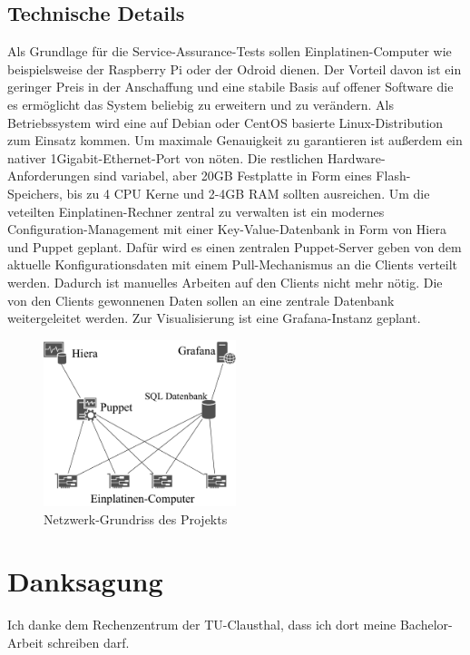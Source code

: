 \documentclass[conference]{IEEEtran}
\begin{document}
\subsection{Technische Details}
Als Grundlage für die Service-Assurance-Tests sollen
Einplatinen-Computer wie beispielsweise der Raspberry Pi oder der Odroid
dienen. Der Vorteil davon ist ein geringer Preis in der Anschaffung und
eine stabile Basis auf offener Software die es ermöglicht das System
beliebig zu erweitern und zu verändern. Als Betriebssystem wird eine auf
Debian oder CentOS basierte Linux-Distribution zum Einsatz kommen. Um
maximale Genauigkeit zu garantieren ist außerdem ein nativer
1Gigabit-Ethernet-Port von nöten. Die restlichen Hardware-Anforderungen
sind variabel, aber 20GB Festplatte in Form eines Flash-Speichers, bis
zu 4 CPU Kerne und 2-4GB RAM sollten ausreichen. Um die veteilten
Einplatinen-Rechner zentral zu verwalten ist ein modernes
Configuration-Management mit einer Key-Value-Datenbank in Form von Hiera
und Puppet geplant. Dafür wird es einen zentralen Puppet-Server geben
von dem aktuelle Konfigurationsdaten mit einem Pull-Mechanismus an die
Clients verteilt werden. Dadurch ist manuelles Arbeiten auf den Clients
nicht mehr nötig. Die von den Clients gewonnenen Daten sollen an eine
zentrale Datenbank weitergeleitet werden. Zur Visualisierung ist eine
Grafana-Instanz geplant.
\begin{figure}[h]
    \centering
    \includegraphics[width=0.5\textwidth]{figures/network.pdf}
    \caption{Netzwerk-Grundriss des Projekts}\label{fig:1}
\end{figure}

\section*{Danksagung}
Ich danke dem Rechenzentrum der TU-Clausthal, dass ich dort meine
Bachelor-Arbeit schreiben darf.
\end{document}

